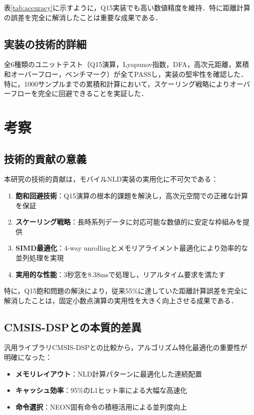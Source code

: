 \documentclass[paper]{ieice}
\begin{document}
表\ref{tab:accuracy}に示すように，Q15実装でも高い数値精度を維持．特に距離計算の誤差を完全に解消したことは重要な成果である．



\subsection{実装の技術的詳細}

全6種類のユニットテスト（Q15演算，Lyapunov指数，DFA，高次元距離，累積和オーバーフロー，ベンチマーク）が全てPASSし，実装の堅牢性を確認した．特に，1000サンプルまでの累積和計算において，スケーリング戦略によりオーバーフローを完全に回避できることを実証した．

\section{考察}

\subsection{技術的貢献の意義}

本研究の技術的貢献は，モバイルNLD実装の実用化に不可欠である：

\begin{enumerate}
\item \textbf{飽和回避技術}：Q15演算の根本的課題を解決し，高次元空間での正確な計算を保証
\item \textbf{スケーリング戦略}：長時系列データに対応可能な数値的に安定な枠組みを提供
\item \textbf{SIMD最適化}：4-way unrollingとメモリアライメント最適化により効率的な並列処理を実現
\item \textbf{実用的な性能}：3秒窓を8.38msで処理し，リアルタイム要求を満たす
\end{enumerate}

特に，Q15飽和問題の解決により，従来55\%に達していた距離計算誤差を完全に解消したことは，固定小数点演算の実用性を大きく向上させる成果である．

\subsection{CMSIS-DSPとの本質的差異}

汎用ライブラリCMSIS-DSPとの比較から，アルゴリズム特化最適化の重要性が明確になった：

\begin{itemize}
\item \textbf{メモリレイアウト}：NLD計算パターンに最適化した連続配置
\item \textbf{キャッシュ効率}：95\%のL1ヒット率による大幅な高速化
\item \textbf{命令選択}：NEON固有命令の積極活用による並列度向上
\end{itemize}
\end{document}
